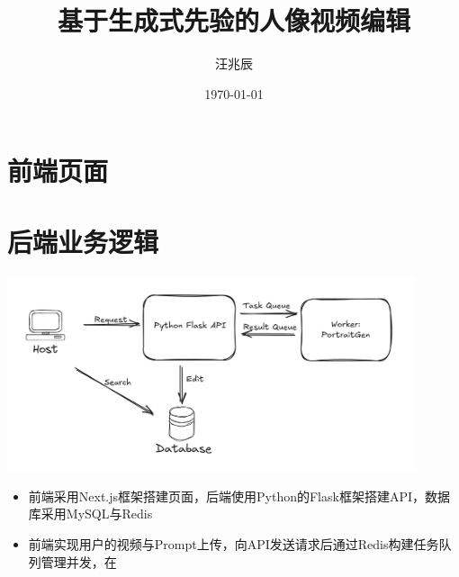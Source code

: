 \documentclass{beamer}
\title{基于生成式先验的人像视频编辑}
\author{汪兆辰}
\date{\ukdate\today}
\begin{document}
\begin{frame}
    \titlepage
\end{frame}

\section{前端页面}

\begin{frame}
\end{frame}

\section{后端业务逻辑}

\begin{frame}
    \includegraphics[width=0.9\textwidth]{pic1.png}
    \begin{itemize}
        \item 前端采用Next.js框架搭建页面，后端使用Python的Flask框架搭建API，数据库采用MySQL与Redis
        \item 前端实现用户的视频与Prompt上传，向API发送请求后通过Redis构建任务队列管理并发，在

    \end{itemize}

\end{frame}
\end{document}
